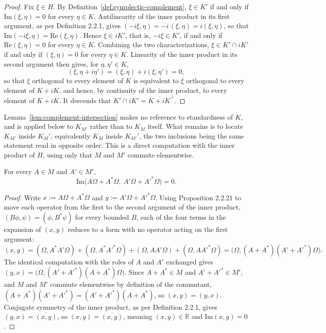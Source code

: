 \begin{proof}
	Fix $\xi \in H$. By Definition~\ref{def:symplectic-complement}, $\xi \in K'$ if and only if $\mathrm{Im}(\xi,\eta) = 0$ for every $\eta \in K$. Antilinearity of the inner product in its first argument, as per Definition 2.2.1, gives $(-i\xi,\eta) = \overline{-i}\,(\xi,\eta) = i(\xi,\eta)$, so that $\mathrm{Im}(-i\xi,\eta) = \mathrm{Re}(\xi,\eta)$. Hence $\xi \in iK'$, that is, $-i\xi \in K'$, if and only if $\mathrm{Re}(\xi,\eta) = 0$ for every $\eta \in K$. Combining the two characterizations, $\xi \in K' \cap iK'$ if and only if $(\xi,\eta) = 0$ for every $\eta \in K$. Linearity of the inner product in its second argument then gives, for $\eta,\eta' \in K$,
	\[
	(\xi,\eta+i\eta') = (\xi,\eta) + i(\xi,\eta') = 0,
	\]
	so that $\xi$ orthogonal to every element of $K$ is equivalent to $\xi$ orthogonal to every element of $K+iK$, and hence, by continuity of the inner product, to every element of $\overline{K+iK}$. It descends that $K'\cap iK' = \overline{K+iK}^{\perp}$.
\end{proof}

Lemma~\ref{lem:complement-intersection} makes no reference to standardness of $K$, and is applied below to $K_{M'}$ rather than to $K_M$ itself. What remains is to locate $K_{M'}$ inside $K_M'$, equivalently $K_M$ inside $K_{M'}'$, the two inclusions being the same statement read in opposite order. This is a direct computation with the inner product of $H$, using only that $M$ and $M'$ commute elementwise.

\begin{lemma}\label{lem:MMp-orthogonal}
	For every $A \in M$ and $A' \in M'$,
	\[
	\mathrm{Im}\big(A\Omega + A^*\Omega,\ A'\Omega + A'^*\Omega\big) = 0.
	\]
\end{lemma}

\begin{proof}
	Write $x := A\Omega + A^*\Omega$ and $y := A'\Omega + A'^*\Omega$. Using Proposition 2.2.21 to move each operator from the first to the second argument of the inner product, $(B\phi,\psi) = (\phi,B^*\psi)$ for every bounded $B$, each of the four terms in the expansion of $(x,y)$ reduces to a form with no operator acting on the first argument:
	\[
	(x,y) = (\Omega,A^*A'\Omega) + (\Omega,A^*A'^*\Omega) + (\Omega,AA'\Omega) + (\Omega,AA'^*\Omega) = \big(\Omega,(A+A^*)(A'+A'^*)\Omega\big).
	\]
	The identical computation with the roles of $A$ and $A'$ exchanged gives $(y,x) = \big(\Omega,(A'+A'^*)(A+A^*)\Omega\big)$. Since $A+A^* \in M$ and $A'+A'^* \in M'$, and $M$ and $M'$ commute elementwise by definition of the commutant, $(A+A^*)(A'+A'^*) = (A'+A'^*)(A+A^*)$, so $(x,y) = (y,x)$. Conjugate symmetry of the inner product, as per Definition 2.2.1, gives $(y,x) = \overline{(x,y)}$, so $(x,y) = \overline{(x,y)}$, meaning $(x,y) \in \mathbb{R}$ and $\mathrm{Im}(x,y) = 0$.
\end{proof}

